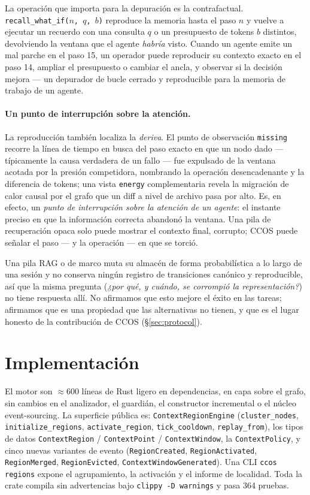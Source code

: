 \documentclass[11pt]{article}
\newcommand{\code}[1]{\texttt{#1}}
\begin{document}
La operación que importa para la depuración es la contrafactual.
\code{recall\_what\_if($n$, $q$, $b$)} reproduce la memoria hasta el paso $n$ y vuelve
a ejecutar un recuerdo con una consulta $q$ o un presupuesto de tokens $b$ distintos,
devolviendo la ventana que el agente \emph{habría} visto. Cuando un agente emite un
mal parche en el paso 15, un operador puede reproducir su contexto exacto en el paso
14, ampliar el presupuesto o cambiar el ancla, y observar si la decisión mejora --- un
depurador de bucle cerrado y reproducible para la memoria de trabajo de un agente.

\paragraph{Un punto de interrupción sobre la atención.} La reproducción también
localiza la \emph{deriva}. El punto de observación \code{missing} recorre la línea de
tiempo en busca del paso exacto en que un nodo dado --- típicamente la causa
verdadera de un fallo --- fue expulsado de la ventana acotada por la presión
competidora, nombrando la operación desencadenante y la diferencia de tokens; una
vista \code{energy} complementaria revela la migración de calor causal por el grafo
que un diff a nivel de archivo pasa por alto. Es, en efecto, un \emph{punto de
interrupción sobre la atención de un agente}: el instante preciso en que la
información correcta abandonó la ventana. Una pila de recuperación opaca solo puede
mostrar el contexto final, corrupto; CCOS puede señalar el paso --- y la operación ---
en que se torció.

Una pila RAG o de marco muta su almacén de forma probabilística a lo largo de una sesión y
no conserva ningún registro de transiciones canónico y reproducible, así que la misma
pregunta (\emph{¿por qué, y cuándo, se corrompió la representación?}) no tiene
respuesta allí. No afirmamos que esto mejore el éxito en las tareas; afirmamos que es
una propiedad que las alternativas no tienen, y que es el lugar honesto de la
contribución de CCOS (\S\ref{sec:protocol}).

\section{Implementación}\label{sec:impl}

El motor son $\approx\!600$ líneas de Rust ligero en dependencias, en capa sobre el
grafo, sin cambios en el analizador, el guardián, el constructor incremental o el
núcleo event-sourcing. La superficie pública es: \code{ContextRegionEngine}
(\code{cluster\_nodes}, \code{initialize\_regions}, \code{activate\_region},
\code{tick\_cooldown}, \code{replay\_from}), los tipos de datos \code{ContextRegion} /
\code{ContextPoint} / \code{ContextWindow}, la \code{ContextPolicy}, y cinco nuevas
variantes de evento (\code{RegionCreated}, \code{RegionActivated}, \code{RegionMerged},
\code{RegionEvicted}, \code{ContextWindowGenerated}). Una CLI \code{ccos regions}
expone el agrupamiento, la activación y el informe de localidad. Toda la crate compila
sin advertencias bajo \code{clippy -D warnings} y pasa 364 pruebas.
\end{document}
